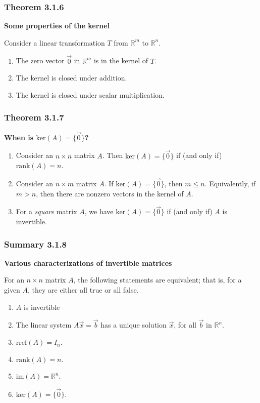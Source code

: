 \documentclass{report}
\begin{document}
\subsubsection*{Theorem 3.1.6}
\par\noindent\textbf{Some properties of the kernel}
\par\noindent Consider a linear transformation $T$ from $\mathbb{R}^{m}$ to $\mathbb{R}^{n}$.
\renewcommand{\labelenumi}{\textbf{\alph{enumi}.}}
\begin{enumerate}
\item The zero vector $\vec{0}$ in $\mathbb{R}^{m}$ is in the kernel of $T$.
\item The kernel is closed under addition.
\item The kernel is closed under scalar multiplication.
\end{enumerate}
\subsubsection*{Theorem 3.1.7}
\par\noindent\textbf{When is $\textrm{ker}(A)=\{\vec{0}\}$?}
\renewcommand{\labelenumi}{\textbf{\alph{enumi}.}}
\begin{enumerate}
\item Consider an $n\times{}n$ matrix $A$. Then $\textrm{ker}(A)=\{\vec{0}\}$ if (and only if) $\textrm{rank}(A)=n$.
\item Consider an $n\times{}m$ matrix $A$. If $\textrm{ker}(A)=\{\vec{0}\}$, then $m\le{}n$. Equivalently, if $m>n$, then there are nonzero vectors in the kernel of $A$.
\item For a \textit{square} matrix $A$, we have $\textrm{ker}(A)=\{\vec{0}\}$ if (and only if) $A$ is invertible.
\end{enumerate}
\subsubsection*{Summary 3.1.8}
\par\noindent\textbf{Various characterizations of invertible matrices}
\par\noindent For an $n\times{}n$ matrix $A$, the following statements are equivalent; that is, for a given $A$, they are either all true or all false.
\renewcommand{\labelenumi}{\textbf{\roman{enumi}.}}
\begin{enumerate}
\item $A$ is invertible
\item The linear system $A\vec{x}=\vec{b}$ has a unique solution $\vec{x}$, for all $\vec{b}$ in $\mathbb{R}^{n}$.
\item $\textrm{rref}(A)=I_{n}$.
\item $\textrm{rank}(A)=n$.
\item $\textrm{im}(A)=\mathbb{R}^{n}$.
\item $\textrm{ker}(A)=\{\vec{0}\}$.
\end{enumerate}
\pagebreak
\end{document}
